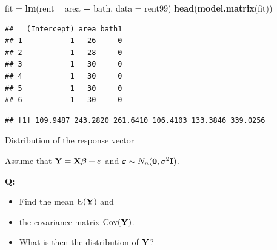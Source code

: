 \documentclass[10pt,ignorenonframetext,]{beamer}
\newenvironment{Shaded}{\begin{snugshade}}{\end{snugshade}}
\newcommand{\KeywordTok}[1]{\textcolor[rgb]{0.13,0.29,0.53}{\textbf{#1}}}
\newcommand{\DataTypeTok}[1]{\textcolor[rgb]{0.13,0.29,0.53}{#1}}
\newcommand{\StringTok}[1]{\textcolor[rgb]{0.31,0.60,0.02}{#1}}
\newcommand{\OperatorTok}[1]{\textcolor[rgb]{0.81,0.36,0.00}{\textbf{#1}}}
\newcommand{\NormalTok}[1]{#1}
\providecommand{\tightlist}{%
  \setlength{\itemsep}{0pt}\setlength{\parskip}{0pt}}
\begin{document}
\begin{frame}[fragile]

\small

\begin{Shaded}
\begin{Highlighting}[]
\NormalTok{fit =}\StringTok{ }\KeywordTok{lm}\NormalTok{(rent }\OperatorTok{~}\StringTok{ }\NormalTok{area }\OperatorTok{+}\StringTok{ }\NormalTok{bath, }\DataTypeTok{data =}\NormalTok{ rent99)}
\KeywordTok{head}\NormalTok{(}\KeywordTok{model.matrix}\NormalTok{(fit))}
\end{Highlighting}
\end{Shaded}

\begin{verbatim}
##   (Intercept) area bath1
## 1           1   26     0
## 2           1   28     0
## 3           1   30     0
## 4           1   30     0
## 5           1   30     0
## 6           1   30     0
\end{verbatim}

\begin{Shaded}
\end{Shaded}

\begin{verbatim}
## [1] 109.9487 243.2820 261.6410 106.4103 133.3846 339.0256
\end{verbatim}

\normalsize

\end{frame}

\begin{frame}

\begin{block}{Distribution of the response vector}

Assume that \({\bf Y=X \boldsymbol\beta}+{\boldsymbol \varepsilon}\) and
\(\boldsymbol\varepsilon\sim N_n({\bf 0},\sigma^2 {\bf I})\).

\textbf{Q:}

\begin{itemize}
\tightlist
\item
  Find the mean \(\text{E}(\bf Y)\) and
\item
  the covariance matrix \(\text{Cov}(\bf Y)\).
\item
  What is then the distribution of \(\bf Y\)?
\end{itemize}

\end{block}

\end{frame}
\end{document}
